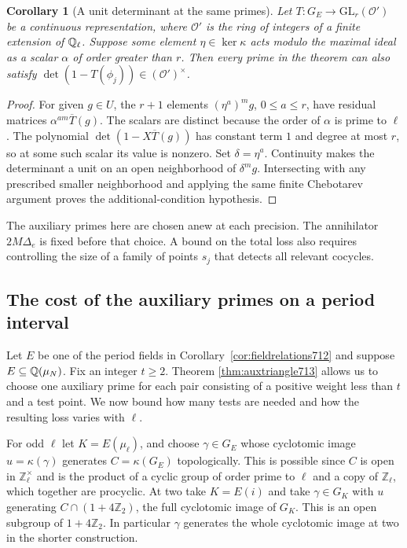\documentclass[a4paper,11pt]{article}
\newtheorem{corollary}[proposition]{Corollary}
\theoremstyle{definition}
\theoremstyle{remark}
\newcommand{\ZZ}{\mathbb Z}\newcommand{\ord}{\operatorname{ord}}
\numberwithin{equation}{section}
\begin{document}
\begin{corollary}[A unit determinant at the same primes]\leavevmode
\label{cor:scalarfrob713}
Let \(T:G_E\to\mathrm{GL}_r(\mathcal O')\) be a continuous
representation, where \(\mathcal O'\) is the ring of integers
of a finite extension of \(\mathbb Q_\ell\). Suppose some element
\(\eta\in\ker\kappa\) acts modulo the maximal ideal as a scalar
\(\alpha\) of order greater than \(r\). Then every prime in the
theorem can also satisfy
\(\det(1-T(\phi_j))\in(\mathcal O')^\times\).
\end{corollary}
\begin{proof}
For given \(g\in U\), the \(r+1\) elements
\((\eta^a)^m g\), \(0\le a\le r\), have residual matrices
\(\alpha^{am}\overline T(g)\). The scalars are distinct
because the order of \(\alpha\) is prime to \(\ell\).
The polynomial \(\det(1-X\overline T(g))\) has constant
term \(1\) and degree at most \(r\), so at some such scalar
its value is nonzero. Set \(\delta=\eta^a\). Continuity makes
the determinant a unit on an open neighborhood of \(\delta^m g\).
Intersecting with any prescribed smaller neighborhood and
applying the same finite Chebotarev argument proves the
additional-condition hypothesis.
\end{proof}

The auxiliary primes here are chosen anew at each precision.
The annihilator \(2M\Delta_e\) is fixed before that choice.
A bound on the total loss also requires controlling the size
of a family of points \(s_j\) that detects all relevant
cocycles.
\clearpage


\subsection{The cost of the auxiliary primes on a period interval}
\label{sec:auxiliarycost714}

Let \(E\) be one of the period fields in
Corollary~\ref{cor:fieldrelations712} and suppose
\(E\subseteq\mathbb Q(\mu_N)\). Fix an integer \(t\ge2\). Theorem
\ref{thm:auxtriangle713} allows us to choose one auxiliary
prime for each pair consisting of a positive weight less
than \(t\) and a test point. We now bound how many tests
are needed and how the resulting loss varies with \(\ell\).

For odd \(\ell\) let \(K=E(\mu_\ell)\), and choose
\(\gamma\in G_E\) whose cyclotomic image \(u=\kappa(\gamma)\)
generates \(C=\kappa(G_E)\) topologically. This is possible
since \(C\) is open in \(\ZZ_\ell^\times\) and is the product
of a cyclic group of order prime to \(\ell\) and a copy of
\(\ZZ_\ell\), which together are procyclic. At two take
\(K=E(i)\) and take \(\gamma\in G_K\) with \(u\) generating
\(C\cap(1+4\ZZ_2)\), the full cyclotomic image of \(G_K\).
This is an open subgroup of \(1+4\ZZ_2\). In particular
\(\gamma\) generates the whole cyclotomic image at two in the
shorter construction.
\end{document}
